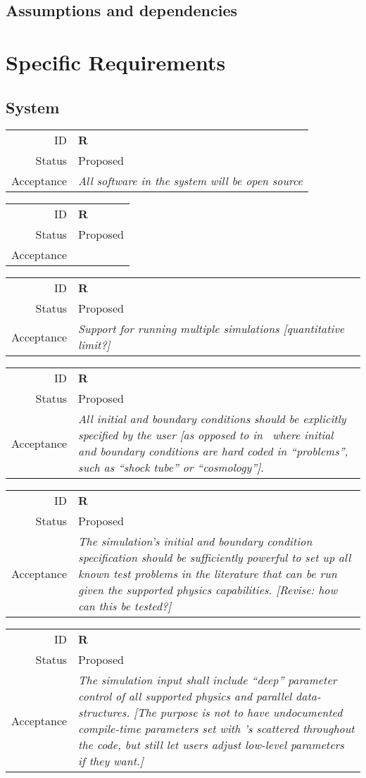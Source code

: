 \documentclass{book}
\newcommand{\req}[3]{
\begin{tabular}{rl}
ID & \textbf{R#1} \\
Status & \textsf{#2} \\
Acceptance & \textit{#3}
\end{tabular}
}
\begin{document}
\section{Assumptions and dependencies}

\chapter{Specific Requirements} \label{c:req}

\section{System}

\req
  {}
  {Proposed}
%
  {All software in the system will be open source}

\req
  {}
  {Proposed}
%
  {}


\req
  {}
  {Proposed}
%
  {Support for running multiple simulations
  [quantitative limit?]}

\req
  {}
  {Proposed}
%
  {All initial and boundary conditions should be explicitly
  specified by the user [as opposed to in \enzo\ where
  initial and boundary conditions are hard coded in ``problems'',
  such as ``shock tube'' or ``cosmology''].}

\req
  {}
  {Proposed}
%
  {The simulation's initial and boundary condition specification
   should be sufficiently powerful to set up all known test problems
   in the literature that can be run given the supported physics
   capabilities. [Revise: how can this be tested?]}

\req
  {}
  {Proposed}
%
  {The simulation input shall include ``deep'' parameter control of
    all supported physics and parallel data-structures. [The purpose
      is not to have undocumented compile-time parameters set with
      \code{\#define}'s scattered throughout the code, but still let
      users adjust low-level parameters if they want.]}
\end{document}
